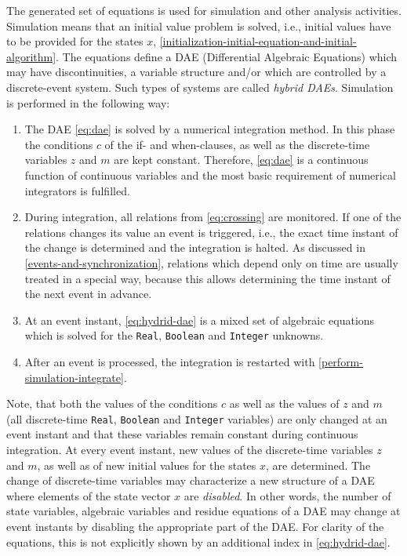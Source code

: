 The generated set of equations is used for simulation and other analysis
activities. Simulation means that an initial value problem is solved,
i.e., initial values have to be provided for the states $x$, \cref{initialization-initial-equation-and-initial-algorithm}.
The equations define a DAE (Differential Algebraic Equations) which may
have discontinuities, a variable structure and/or which are controlled
by a discrete-event system. Such types of systems are called
\emph{hybrid DAEs}. Simulation is performed in the following way:
\begin{enumerate}
\item\label{perform-simulation-integrate}
  The DAE \eqref{eq:dae} is solved by a numerical integration method. In this
  phase the conditions $c$ of the if- and when-clauses, as well as the
  discrete-time variables $z$ and $m$ are kept constant. Therefore, \eqref{eq:dae} is a
  continuous function of continuous variables and the most basic
  requirement of numerical integrators is fulfilled.
\item
  During integration, all relations from \eqref{eq:crossing} are monitored. If one of
  the relations changes its value an event is triggered, i.e., the exact
  time instant of the change is determined and the integration is
  halted. As discussed in \cref{events-and-synchronization}, relations which depend only on
  time are usually treated in a special way, because this allows
  determining the time instant of the next event in advance.
\item
  At an event instant, \eqref{eq:hydrid-dae} is a mixed set of algebraic equations which is solved for the \lstinline!Real!, \lstinline!Boolean! and \lstinline!Integer! unknowns.
\item
  After an event is processed, the integration is restarted with \ref{perform-simulation-integrate}.
\end{enumerate}

Note, that both the values of the conditions $c$ as well as the values of
$z$ and $m$ (all discrete-time \lstinline!Real!, \lstinline!Boolean! and \lstinline!Integer! variables) are only changed at
an event instant and that these variables remain constant during
continuous integration. At every event instant, new values of the
discrete-time variables $z$ and $m$, as well as of new initial values for the states $x$, are
determined. The change of discrete-time variables may characterize a new
structure of a DAE where elements of the state vector $x$ are
\emph{disabled}. In other words, the number of state variables,
algebraic variables and residue equations of a DAE may change at event
instants by disabling the appropriate part of the DAE. For clarity of
the equations, this is not explicitly shown by an additional index in
\eqref{eq:hydrid-dae}.

